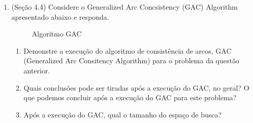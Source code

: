 \documentclass{article}
\begin{document}
\begin{enumerate}
\item (Seção 4.4) Considere o Generalized Arc Concsistency (GAC) Algorithm apresentado abaixo e responda.

\begin{figure}[!ht]
    
    \caption{Algoritmo GAC}
\end{figure}

\begin{enumerate}
    \item Demonstre a execução do algoritmo de consistência de arcos, GAC (Generalized Arc Consitency Algorithm) para o problema da questão anterior.
    \item Quais conclusões pode ser tiradas após a execução do GAC, no geral? O que podemos concluir após a execução do GAC para este problema?
    \item Após a execução do GAC, qual o tamanho do espaço de busca?
\end{enumerate}

\end{enumerate}




\end{document}
